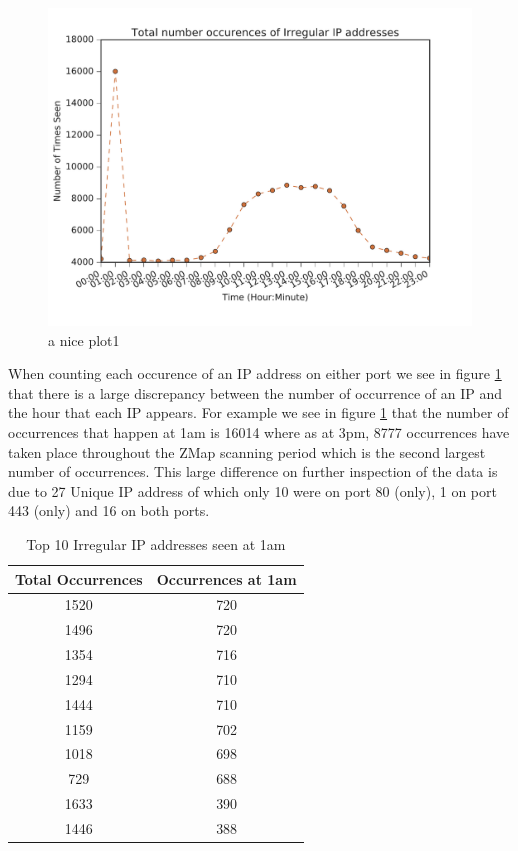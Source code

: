 \documentclass[a4wide,leqno,12pt]{report}
\begin{document}
\begin{figure}[H]
\centering
\includegraphics[scale=.5]{pdf_images/TotalNumberOccurencesOfIrregularIPaddressesOnAverage}
\caption{a nice plot1}
\label{fig:irreg_occurence}
\end{figure}
When counting each occurence of an IP address on either port we see in figure \ref{fig:irreg_occurence} that there is a large discrepancy between the number of occurrence of an IP and the hour that each IP appears. For example we see in figure \ref{fig:irreg_occurence} that the number of occurrences that happen at 1am is 16014 where as at 3pm, 8777 occurrences have taken place throughout the ZMap scanning period which is the second largest number of occurrences. This large difference on further inspection of the data is due to 27 Unique IP address of which only 10 were on port 80 (only), 1 on port 443 (only) and 16 on both ports.



\begin{table}
\centering
\begin{tabular}{|| c c ||}
 \hline
  Total Occurrences & Occurrences at 1am  \\ [0.5ex]
 \hline\hline
 1520 & 720  \\
 1496 & 720 \\
 1354 & 716 \\
 1294 & 710  \\
 1444 & 710 \\
 1159 & 702 \\
 1018 & 698 \\
 729 & 688  \\
 1633 & 390 \\
 1446 & 388 \\[1ex]
 \hline
\end{tabular}
\caption{Top 10 Irregular IP addresses seen at 1am }
\label{table:2}
\end{table}
\end{document}
